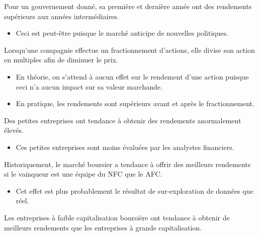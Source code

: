 \documentclass[10pt, french]{article}
\begin{document}
\begin{multicols*}{2}
\begin{definitionNOHFILLprop}
Pour un gouvernement donné, sa première et dernière année ont des rendements supérieurs aux années intermédiaires.

\begin{itemize}
	\item	Ceci est peut-être puisque le marché anticipe de nouvelles politiques.
\end{itemize}
\end{definitionNOHFILLprop}

\begin{definitionNOHFILLprop}
Lorsqu'une compagnie effectue un fractionnement d'actions, elle divise son action en multiples afin de diminuer le prix.
\begin{itemize}
	\item	En théorie, on s'attend à aucun effet sur le rendement d'une action puisque ceci n'a aucun impact sur sa valeur marchande.
	\item	En pratique, les rendements sont supérieurs avant et après le fractionnement.
\end{itemize}
\end{definitionNOHFILLprop}

\begin{definitionNOHFILLprop}
Des petites entreprises ont tendance à obtenir des rendements anormalement élevés. 

\begin{itemize}
	\item	Ces petites entreprises sont moins évaluées par les analystes financiers.
\end{itemize}
\end{definitionNOHFILLprop}

\begin{definitionNOHFILLprop}
Historiquement, le marché boursier a tendance à offrir des meilleurs rendements si le vainqueur est une équipe du NFC que le AFC.

\begin{itemize}
	\item	Cet effet est plus probablement le résultat de sur-exploration de données que réel.
\end{itemize}
\end{definitionNOHFILLprop}

\begin{definitionNOHFILLprop}
Les entreprises à faible capitalisation boursière ont tendance à obtenir de meilleurs rendements que les entreprises à grande capitalisation.
\end{definitionNOHFILLprop}


\end{multicols*}
\end{document}

